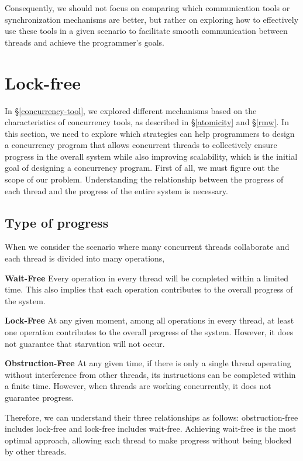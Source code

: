 \documentclass[fontsize=10pt, oneside]{scrartcl}
\newcommand{\secref}[1]{\hyperref[#1]{\textsc{\S}\ref*{#1}}}
\begin{document}
Consequently, we should not focus on comparing which communication tools or synchronization mechanisms are better, 
but rather on exploring how to effectively use these tools in a given scenario to facilitate smooth communication between threads and achieve the programmer's goals.

\section{Lock-free}
In \secref{concurrency-tool}, we explored different mechanisms based on the characteristics of concurrency tools, 
as described in \secref{atomicity} and \secref{rmw}.
In this section, we need to explore which strategies can help programmers to design a concurrency program 
that allows concurrent threads to collectively ensure progress in the overall system while also improving scalability, 
which is the initial goal of designing a concurrency program.
First of all, we must figure out the scope of our problem.
Understanding the relationship between the progress of each thread and the progress of the entire system is necessary.

\subsection{Type of progress}
When we consider the scenario where many concurrent threads collaborate and each thread is divided into many operations, 

\textbf{Wait-Free} Every operation in every thread will be completed within a limited time. 
This also implies that each operation contributes to the overall progress of the system.

\textbf{Lock-Free} At any given moment, among all operations in every thread, 
at least one operation contributes to the overall progress of the system. 
However, it does not guarantee that starvation will not occur.

\textbf{Obstruction-Free} At any given time, if there is only a single thread operating without interference from other threads, 
its instructions can be completed within a finite time. However, when threads are working concurrently, 
it does not guarantee progress.

Therefore, we can understand their three relationships as follows:
obstruction-free includes lock-free and lock-free includes wait-free.
Achieving wait-free is the most optimal approach, 
allowing each thread to make progress without being blocked by other threads.
\end{document}
